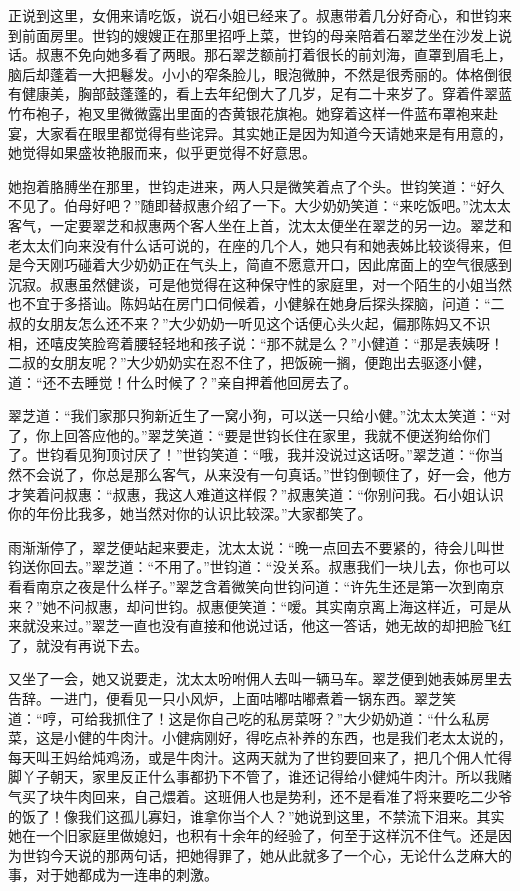 \par 正说到这里，女佣来请吃饭，说石小姐已经来了。叔惠带着几分好奇心，和世钧来到前面房里。世钧的嫂嫂正在那里招呼上菜，世钧的母亲陪着石翠芝坐在沙发上说话。叔惠不免向她多看了两眼。那石翠芝额前打着很长的前刘海，直罩到眉毛上，脑后却蓬着一大把鬈发。小小的窄条脸儿，眼泡微肿，不然是很秀丽的。体格倒很有健康美，胸部鼓蓬蓬的，看上去年纪倒大了几岁，足有二十来岁了。穿着件翠蓝竹布袍子，袍叉里微微露出里面的杏黄银花旗袍。她穿着这样一件蓝布罩袍来赴宴，大家看在眼里都觉得有些诧异。其实她正是因为知道今天请她来是有用意的，她觉得如果盛妆艳服而来，似乎更觉得不好意思。
\par 她抱着胳膊坐在那里，世钧走进来，两人只是微笑着点了个头。世钧笑道：“好久不见了。伯母好吧？”随即替叔惠介绍了一下。大少奶奶笑道：“来吃饭吧。”沈太太客气，一定要翠芝和叔惠两个客人坐在上首，沈太太便坐在翠芝的另一边。翠芝和老太太们向来没有什么话可说的，在座的几个人，她只有和她表姊比较谈得来，但是今天刚巧碰着大少奶奶正在气头上，简直不愿意开口，因此席面上的空气很感到沉寂。叔惠虽然健谈，可是他觉得在这种保守性的家庭里，对一个陌生的小姐当然也不宜于多搭讪。陈妈站在房门口伺候着，小健躲在她身后探头探脑，问道：“二叔的女朋友怎么还不来？”大少奶奶一听见这个话便心头火起，偏那陈妈又不识相，还嘻皮笑脸弯着腰轻轻地和孩子说：“那不就是么？”小健道：“那是表姨呀！二叔的女朋友呢？”大少奶奶实在忍不住了，把饭碗一搁，便跑出去驱逐小健，道：“还不去睡觉！什么时候了？”亲自押着他回房去了。
\par 翠芝道：“我们家那只狗新近生了一窝小狗，可以送一只给小健。”沈太太笑道：“对了，你上回答应他的。”翠芝笑道：“要是世钧长住在家里，我就不便送狗给你们了。世钧看见狗顶讨厌了！”世钧笑道：“哦，我并没说过这话呀。”翠芝道：“你当然不会说了，你总是那么客气，从来没有一句真话。”世钧倒顿住了，好一会，他方才笑着问叔惠：“叔惠，我这人难道这样假？”叔惠笑道：“你别问我。石小姐认识你的年份比我多，她当然对你的认识比较深。”大家都笑了。
\par 雨渐渐停了，翠芝便站起来要走，沈太太说：“晚一点回去不要紧的，待会儿叫世钧送你回去。”翠芝道：“不用了。”世钧道：“没关系。叔惠我们一块儿去，你也可以看看南京之夜是什么样子。”翠芝含着微笑向世钧问道：“许先生还是第一次到南京来？”她不问叔惠，却问世钧。叔惠便笑道：“嗳。其实南京离上海这样近，可是从来就没来过。”翠芝一直也没有直接和他说过话，他这一答话，她无故的却把脸飞红了，就没有再说下去。
\par 又坐了一会，她又说要走，沈太太吩咐佣人去叫一辆马车。翠芝便到她表姊房里去告辞。一进门，便看见一只小风炉，上面咕嘟咕嘟煮着一锅东西。翠芝笑道：“哼，可给我抓住了！这是你自己吃的私房菜呀？”大少奶奶道：“什么私房菜，这是小健的牛肉汁。小健病刚好，得吃点补养的东西，也是我们老太太说的，每天叫王妈给炖鸡汤，或是牛肉汁。这两天就为了世钧要回来了，把几个佣人忙得脚丫子朝天，家里反正什么事都扔下不管了，谁还记得给小健炖牛肉汁。所以我赌气买了块牛肉回来，自己煨着。这班佣人也是势利，还不是看准了将来要吃二少爷的饭了！像我们这孤儿寡妇，谁拿你当个人？”她说到这里，不禁流下泪来。其实她在一个旧家庭里做媳妇，也积有十余年的经验了，何至于这样沉不住气。还是因为世钧今天说的那两句话，把她得罪了，她从此就多了一个心，无论什么芝麻大的事，对于她都成为一连串的刺激。
